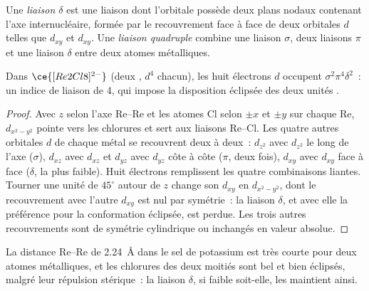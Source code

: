 \begin{definition}\label{def:b3:organometallic-bonding:delta}
Une \emph{liaison $\delta$} est une liaison dont l'orbitale possède deux plans nodaux
contenant l'axe internucléaire, formée par le recouvrement face à face de
deux orbitales $d$ telles que $d_{xy}$ et $d_{xy}$. Une \emph{liaison quadruple}
combine une liaison $\sigma$, deux liaisons $\pi$ et une liaison $\delta$ entre deux atomes métalliques.
\end{definition}

\begin{proposition}\label{prop:b3:organometallic-bonding:quadruple}
Dans $\ce{[Re2Cl8]^{2-}}$ (deux , $d^4$ chacun), les huit électrons $d$ occupent $\sigma^2\pi^4\delta^2$~: un
indice de liaison de 4, qui impose la disposition éclipsée des deux unités
.
\end{proposition}

\begin{proof}
Avec $z$ selon l'axe Re--Re et les atomes Cl selon $\pm x$ et $\pm y$ sur chaque Re, $d_{x^2-y^2}$
pointe vers les chlorures et sert aux liaisons Re--Cl. Les quatre autres orbitales $d$
de chaque métal se recouvrent deux à deux~: $d_{z^2}$ avec $d_{z^2}$ le long de l'axe ($\sigma$), $d_{xz}$ avec $d_{xz}$ et $d_{yz}$
avec $d_{yz}$ côte à côte ($\pi$, deux fois), $d_{xy}$ avec $d_{xy}$ face à face ($\delta$, la plus faible).
Huit électrons remplissent les quatre combinaisons liantes. Tourner une
unité de $45^\circ$ autour de $z$ change son $d_{xy}$ en $d_{x^2-y^2}$, dont le recouvrement avec l'autre $d_{xy}$ est
nul par symétrie~: la liaison $\delta$, et avec elle la préférence pour la
conformation éclipsée, est perdue. Les trois autres recouvrements sont de
symétrie cylindrique ou inchangés en valeur absolue.
\end{proof}

La distance Re--Re de \qty{2.24}{\angstrom} dans le sel de potassium est très courte pour deux atomes métalliques, et les chlorures des deux moitiés sont bel et bien éclipsés, malgré
leur répulsion stérique~: la liaison $\delta$, si faible soit-elle, les maintient ainsi.

